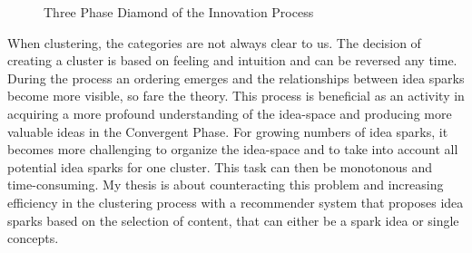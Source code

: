 \documentclass[pdftex,a4paper,12pt]{scrartcl}
\theoremstyle{definition}
\begin{document}
\begin{figure}[h]
    \centering
    \caption{Three Phase Diamond of the Innovation Process \citep{tassoul_clustering:_2007}}
    \label{fig:diamond}
\end{figure}

When clustering, the categories are not always clear to us. The decision of creating a cluster is based on feeling and intuition and can be reversed any time. During the process an ordering emerges and the relationships between idea sparks become more visible, so fare the theory.
This process is beneficial as an activity in acquiring a more profound understanding of the idea-space \citep{siangliulue_ideahound:_2016} and producing more valuable ideas in the Convergent Phase. For growing numbers of idea sparks, it becomes more challenging to organize the idea-space and to take into account all potential idea sparks for one cluster. This task can then be monotonous and time-consuming. My thesis is about counteracting this problem and increasing efficiency in the clustering process with a recommender system that proposes idea sparks based on the selection of content, that can either be a spark idea or single concepts.

     
   
    
\end{document}
